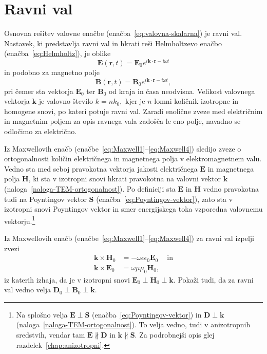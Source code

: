 \section{Ravni val}
Osnovna rešitev valovne enačbe (enačba~\ref{eq:valovna-skalarna}) je ravni 
val. Nastavek, ki predstavlja ravni val in hkrati reši 
Helmholtzevo enačbo (enačba~\ref{eq:Helmholtz}), je oblike
\begin{equation}
\mathbf{E}(\mathbf{r},t) =
\mathbf{E}_{0}e^{i\mathbf{k}\cdot\mathbf{r}-i \omega t}
\end{equation}
in podobno za magnetno polje
\begin{equation}
 \mathbf{B}(\mathbf{r},t) =
\mathbf{B}_{0}e^{i\mathbf{k}\cdot\mathbf{r}-i \omega t},
\end{equation}
pri čemer sta vektorja $\mathbf{E}_{0}$ ter $\mathbf{B}_{0}$ od kraja in časa neodvisna. 
Velikost valovnega vektorja $\mathbf{k}$ je valovno število $k=nk_{0},$ 
kjer je $n$ lomni količnik izotropne in homogene snovi, po kateri potuje ravni val.
Zaradi enolične zveze med električnim in magnetnim poljem 
za opis ravnega vala zadošča le eno polje, navadno se odločimo za električno.

Iz Maxwellovih enačb (enačbe~\ref{eq:Maxwell1}--\ref{eq:Maxwell4}) sledijo zveze o ortogonalnosti
količin električnega in magnetnega polja v elektromagnetnem valu. Vedno sta med seboj pravokotna vektorja
jakosti električnega $\mathbf{E}$ in magnetnega polja $\mathbf{H}$, ki sta v izotropni snovi
hkrati pravokotna na valovni vektor $\mathbf{k}$ (naloga~\ref{naloga-TEM-ortogonalnost}).
Po definiciji sta $\mathbf{E}$ in $\mathbf{H}$ vedno pravokotna tudi na Poyntingov vektor $\mathbf{S}$ 
(enačba~\ref{eq:Poyntingov-vektor}), zato sta v izotropni snovi
Poyntingov vektor in smer energijskega toka vzporedna valovnemu vektorju.\footnote{Na splošno 
velja $\mathbf{E}\perp\mathbf{S}$ (enačba~\ref{eq:Poyntingov-vektor}) in 
$\mathbf{D}\perp\mathbf{k}$ (naloga~\ref{naloga-TEM-ortogonalnost}). 
To velja vedno, tudi v anizotropnih sredstvih, vendar tam $\mathbf{E} \nparallel 
\mathbf{D}$ in $\mathbf k\nparallel\mathbf S$. Za podrobnejši opis glej 
razdelek~\ref{chap:anizotropni}.} 
\begin{naloga}
\label{naloga-TEM-ortogonalnost}
Iz Maxwellovih enačb (enačbe~\ref{eq:Maxwell1}--\ref{eq:Maxwell4}) za ravni val izpelji zvezi
\begin{align}
\mathbf{k}\times\mathbf{H}_{0} & =-\omega\epsilon\epsilon_{0}\mathbf{E}_{0}\label{eq:TEM-pogoj1}\
\quad \mathrm{in}\\
\mathbf{k}\times\mathbf{E}_{0} & =\omega\mu\mu_{0}\mathbf{H}_{0}\label{eq:TEM-pogoj2},
\end{align}
iz katerih izhaja, da je v izotropni snovi $\mathbf{E}_0\perp \mathbf{H}_0\perp 
\mathbf{k}$.
Pokaži tudi, da za ravni val vedno velja $\mathbf{D}_0 \perp \mathbf{B}_0 \perp \mathbf{k}$.
\end{naloga}

